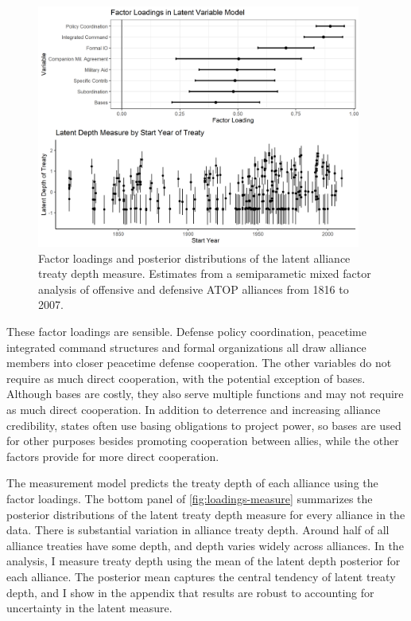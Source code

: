\documentclass[12pt]{article}
\begin{document}
\begin{figure}[hbtp]
\centering
\includegraphics[width=0.95\textwidth]{../figures/loadings-measure.png}
\caption{Factor loadings and posterior distributions of the latent alliance treaty depth measure. Estimates from a semiparametic mixed factor analysis of offensive and defensive ATOP alliances from 1816 to 2007.}
\label{fig:loadings-measure}
\end{figure}


These factor loadings are sensible. 
Defense policy coordination, peacetime integrated command structures and formal organizations all draw alliance members into closer peacetime defense cooperation. 
The other variables do not require as much direct cooperation, with the potential exception of bases.
Although bases are costly, they also serve multiple functions and may not require as much direct cooperation. 
In addition to deterrence and increasing alliance credibility, states often use basing obligations to project power, so bases are used for other purposes besides promoting cooperation between allies, while the other factors provide for more direct cooperation.  


The measurement model predicts the treaty depth of each alliance using the factor loadings. 
The bottom panel of \autoref{fig:loadings-measure} summarizes the posterior distributions of the latent treaty depth measure for every alliance in the data. 
There is substantial variation in alliance treaty depth. 
Around half of all alliance treaties have some depth, and depth varies widely across alliances.
In the analysis, I measure treaty depth using the mean of the latent depth posterior for each alliance. 
The posterior mean captures the central tendency of latent treaty depth, and I show in the appendix that results are robust to accounting for uncertainty in the latent measure. 
\end{document}
